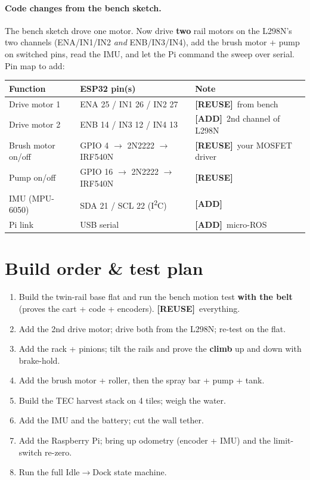 \documentclass[11pt,a4paper]{article}
\newcommand{\reuse}{\textcolor{green!50!black}{\textbf{[REUSE]}}}
\newcommand{\addp}{\textcolor{orange!85!black}{\textbf{[ADD]}}}
\begin{document}
\paragraph{Code changes from the bench sketch.} The bench sketch drove one motor. Now drive \textbf{two}
rail motors on the L298N's two channels (ENA/IN1/IN2 \emph{and} ENB/IN3/IN4), add the brush motor + pump
on switched pins, read the IMU, and let the Pi command the sweep over serial. Pin map to add:

\begin{center}\small
\begin{tabular}{@{}lll@{}}
\toprule
Function & ESP32 pin(s) & Note \\
\midrule
Drive motor 1 & ENA 25 / IN1 26 / IN2 27 & \reuse\ from bench \\
Drive motor 2 & ENB 14 / IN3 12 / IN4 13 & \addp\ 2nd channel of L298N \\
Brush motor on/off & GPIO 4 $\to$ 2N2222 $\to$ IRF540N & \reuse\ your MOSFET driver \\
Pump on/off & GPIO 16 $\to$ 2N2222 $\to$ IRF540N & \reuse \\
IMU (MPU-6050) & SDA 21 / SCL 22 (I\textsuperscript{2}C) & \addp \\
Pi link & USB serial & \addp\ micro-ROS \\
\bottomrule
\end{tabular}
\end{center}

\section{Build order \& test plan}

\begin{enumerate}[leftmargin=*,itemsep=2pt]
  \item Build the twin-rail base flat and run the bench motion test \textbf{with the belt} (proves the
  cart + code + encoders). \reuse\ everything.
  \item Add the 2nd drive motor; drive both from the L298N; re-test on the flat.
  \item Add the rack + pinions; tilt the rails and prove the \textbf{climb} up and down with brake-hold.
  \item Add the brush motor + roller, then the spray bar + pump + tank.
  \item Build the TEC harvest stack on 4 tiles; weigh the water.
  \item Add the IMU and the battery; cut the wall tether.
  \item Add the Raspberry Pi; bring up odometry (encoder + IMU) and the limit-switch re-zero.
  \item Run the full Idle$\to$Dock state machine.
\end{enumerate}
\end{document}
